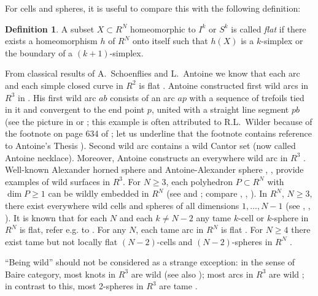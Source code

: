 \documentclass[12pt]{article}
\theoremstyle{definition}
\newtheorem{definition}[theorem]{Definition}
\begin{document}
For cells and spheres,  it is useful to compare
this with
the following definition:

\begin{definition}
A subset $X\subset R^N$ homeomorphic
to $I^k$ or $S^k$ is called {\it flat}
if there exists a homeomorphism $h$
of $R^N$ onto itself such that
$h(X)$ is a $k$-simplex
or
the boundary of a $(k+1)$-simplex.
\end{definition}

From classical results of A.~Schoenflies and L.~Antoine we know that each
arc and each simple closed curve in $R^2$
is flat \cite[II.4]{Keldysh}.
Antoine constructed
first wild arcs in $R^3$ 
in 
\cite[{\bf 54--58}, p.65--70; {\bf 83}, p. 97]{Antoine-diss}.
His first wild arc $ab$ 
\cite[{\bf 54--58}, p.65--70]{Antoine-diss}
consists 
of an arc $ap$ with a sequence of trefoils tied in it and convergent to the end point $p$, 
united with a straight line segment $pb$
(see the picture in \cite[Exercise 2.7.3]{Rushing}
or \cite[Fig.~2.26]{DV}; this example is
often attributed to R.L.~Wilder
because of
the footnote on page 634 of \cite{Wilder};
let us underline that the footnote contains reference to Antoine's Thesis \cite{Antoine-diss}).
Second wild arc \cite[{\bf 83}, p. 97]{Antoine-diss} contains a wild Cantor set (now called Antoine necklace).
Moreover, Antoine constructs an everywhere wild arc in $R^3$ \cite{Antoine-FM}.
Well-known Alexander horned sphere
\cite{Alexander-sphere}
and Antoine-Alexander sphere
\cite[p. 285]{Antoine-CR},
\cite{Alexander},
\cite[{\bf 21}, p.283--284]{Antoine-FM}
provide examples of wild surfaces
in $R^3$.
For $N\geqslant 3$,
each polyhedron $P\subset R^N$ with
${\dim P \geqslant 1}$
can be wildly embedded in $R^N$
(see
\cite{Ivanov-diss}
and \cite{Blankinship};
compare
\cite[{\bf 83}, p. 97]{Antoine-diss}, 
\cite{Antoine-CR},
\cite{Antoine-FM}).
In $R^N$, $N\geqslant 3$, there
exist 
everywhere wild cells and spheres
of all dimensions $1,\ldots , N-1$
(see \cite{Bing-everywhere}, 
\cite[p.86--88, p.73--74]{DV}, 
\cite[Thm. 2.6.1]{Rushing}).
It is known 
that for each $N$ and each $k\neq N-2$
any tame $k$-cell or $k$-sphere
in $R^N$ is flat,
refer e.g. to \cite[Cor.~1.1.2, Thm.~1.1.3, Cor.~1.1.6]{DV}.
For any $N$, each tame arc in $R^N$ is flat
\cite[p.125--126]{Keldysh}.
For $N\geqslant 4$
there exist tame but not locally flat
$(N-2)$-cells and $(N-2)$-spheres in $R^N$
\cite[Example 1.4.2]{DV}.


``Being wild'' should not be considered as a 
strange
exception: in the sense of Baire category,
most knots in $R^3$ are wild \cite[Thm.~1]{Milnor-wild} (see also \cite[Prop. 6.3.8]{DV});
most arcs in $R^3$ are wild \cite{Bothe-wild};
in contrast to this, 
most 2-spheres in $R^3$ are tame \cite{Bothe-wild}.
\end{document}
